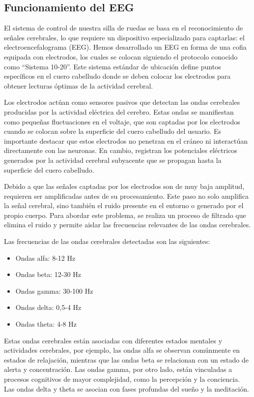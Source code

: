 \documentclass{article}
\begin{document}
\subsection{Funcionamiento del EEG}

El sistema de control de nuestra silla de ruedas se basa en el reconocimiento de señales cerebrales, lo que requiere un dispositivo especializado para captarlas: el electroencefalograma (EEG). Hemos desarrollado un EEG en forma de una cofia equipada con electrodos, los cuales se colocan siguiendo el protocolo conocido como “Sistema 10-20”. Este sistema estándar de ubicación define puntos específicos en el cuero cabelludo donde se deben colocar los electrodos para obtener lecturas óptimas de la actividad cerebral.

Los electrodos actúan como sensores pasivos que detectan las ondas cerebrales producidas por la actividad eléctrica del cerebro. Estas ondas se manifiestan como pequeñas fluctuaciones en el voltaje, que son captadas por los electrodos cuando se colocan sobre la superficie del cuero cabelludo del usuario. Es importante destacar que estos electrodos no penetran en el cráneo ni interactúan directamente con las neuronas. En cambio, registran los potenciales eléctricos generados por la actividad cerebral subyacente que se propagan hasta la superficie del cuero cabelludo.

Debido a que las señales captadas por los electrodos son de muy baja amplitud, requieren ser amplificadas antes de su procesamiento. Este paso no solo amplifica la señal cerebral, sino también el ruido presente en el entorno o generado por el propio cuerpo. Para abordar este problema, se realiza un proceso de filtrado que elimina el ruido y permite aislar las frecuencias relevantes de las ondas cerebrales.

Las frecuencias de las ondas cerebrales detectadas son las siguientes:

\begin{itemize}
    \item Ondas alfa: 8-12 Hz
    \item Ondas beta: 12-30 Hz
    \item Ondas gamma: 30-100 Hz
    \item Ondas delta: 0,5-4 Hz
    \item Ondas theta: 4-8 Hz
\end{itemize}

Estas ondas cerebrales están asociadas con diferentes estados mentales y actividades cerebrales, por ejemplo, las ondas alfa se observan comúnmente en estados de relajación, mientras que las ondas beta se relacionan con un estado de alerta y concentración. Las ondas gamma, por otro lado, están vinculadas a procesos cognitivos de mayor complejidad, como la percepción y la conciencia. Las ondas delta y theta se asocian con fases profundas del sueño y la meditación.
\end{document}
